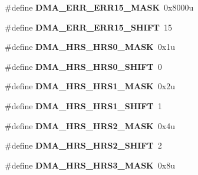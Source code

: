 \begin{DoxyCompactItemize}
\item 
\#define {\bfseries D\+M\+A\+\_\+\+E\+R\+R\+\_\+\+E\+R\+R15\+\_\+\+M\+A\+SK}~0x8000u\hypertarget{group__DMA__Register__Masks_gaa3b260afe4db53c9e602f1f6a5201fff}{}\label{group__DMA__Register__Masks_gaa3b260afe4db53c9e602f1f6a5201fff}

\item 
\#define {\bfseries D\+M\+A\+\_\+\+E\+R\+R\+\_\+\+E\+R\+R15\+\_\+\+S\+H\+I\+FT}~15\hypertarget{group__DMA__Register__Masks_ga2045ddbd1bc78466e6fa9b2ac4202ef1}{}\label{group__DMA__Register__Masks_ga2045ddbd1bc78466e6fa9b2ac4202ef1}

\item 
\#define {\bfseries D\+M\+A\+\_\+\+H\+R\+S\+\_\+\+H\+R\+S0\+\_\+\+M\+A\+SK}~0x1u\hypertarget{group__DMA__Register__Masks_ga39ace553ace4ea0f1da0f2e418ea1cc7}{}\label{group__DMA__Register__Masks_ga39ace553ace4ea0f1da0f2e418ea1cc7}

\item 
\#define {\bfseries D\+M\+A\+\_\+\+H\+R\+S\+\_\+\+H\+R\+S0\+\_\+\+S\+H\+I\+FT}~0\hypertarget{group__DMA__Register__Masks_ga68978d004a9c81063869d7d59553f3e9}{}\label{group__DMA__Register__Masks_ga68978d004a9c81063869d7d59553f3e9}

\item 
\#define {\bfseries D\+M\+A\+\_\+\+H\+R\+S\+\_\+\+H\+R\+S1\+\_\+\+M\+A\+SK}~0x2u\hypertarget{group__DMA__Register__Masks_ga260c7de3089f87d08b58f8c2874dcb2a}{}\label{group__DMA__Register__Masks_ga260c7de3089f87d08b58f8c2874dcb2a}

\item 
\#define {\bfseries D\+M\+A\+\_\+\+H\+R\+S\+\_\+\+H\+R\+S1\+\_\+\+S\+H\+I\+FT}~1\hypertarget{group__DMA__Register__Masks_ga33181a585c24a5532e4756d6f7080a74}{}\label{group__DMA__Register__Masks_ga33181a585c24a5532e4756d6f7080a74}

\item 
\#define {\bfseries D\+M\+A\+\_\+\+H\+R\+S\+\_\+\+H\+R\+S2\+\_\+\+M\+A\+SK}~0x4u\hypertarget{group__DMA__Register__Masks_gaab172f0aec10459f57a424abf8218201}{}\label{group__DMA__Register__Masks_gaab172f0aec10459f57a424abf8218201}

\item 
\#define {\bfseries D\+M\+A\+\_\+\+H\+R\+S\+\_\+\+H\+R\+S2\+\_\+\+S\+H\+I\+FT}~2\hypertarget{group__DMA__Register__Masks_ga5ce6312c610677e9fd618e58cf5db4be}{}\label{group__DMA__Register__Masks_ga5ce6312c610677e9fd618e58cf5db4be}

\item 
\#define {\bfseries D\+M\+A\+\_\+\+H\+R\+S\+\_\+\+H\+R\+S3\+\_\+\+M\+A\+SK}~0x8u\hypertarget{group__DMA__Register__Masks_gab38eb6178d982a70880d2540c8d21533}{}\label{group__DMA__Register__Masks_gab38eb6178d982a70880d2540c8d21533}


\end{DoxyCompactItemize}
